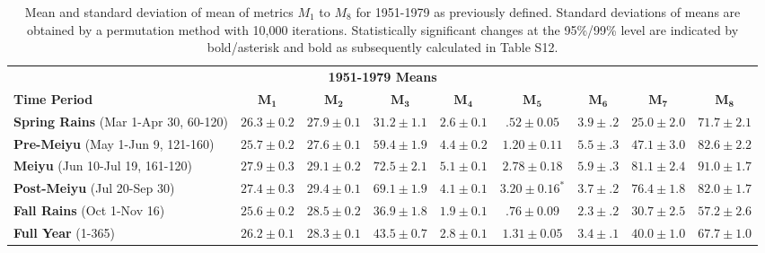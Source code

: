 \begin{table}[p]

\centering

\caption{Mean and standard deviation of mean of metrics $M_1$ to $M_8$ for 1951-1979 as previously defined. Standard deviations of means are obtained by a permutation method with 10,000 iterations. Statistically significant changes at the 95\%/99\% level are indicated by bold/asterisk and bold as subsequently calculated in Table S12.}

\begin{tabular}{ l c c c c c c c c}
	 \multicolumn{9}{c}{\textbf{1951-1979 Means}}  \\
	 \textbf{Time Period} 						& $\boldsymbol{M_1}$ & $\boldsymbol{M_2}$ & $\boldsymbol{M_3}$ & $\boldsymbol{M_4}$ & $\boldsymbol{M_5}$ & $\boldsymbol{M_6}$ & $\boldsymbol{M_7}$ & $\boldsymbol{M_8}$ \\
	 \hline
	\textbf{Spring Rains} (Mar 1-Apr 30, 60-120) 	& $26.3 \pm 0.2$ 	&  $\boldsymbol{27.9 \pm 0.1}$	&  $31.2 \pm 1.1$ 	&$2.6 \pm 0.1$ 	& $.52 \pm 0.05$ 		& $3.9 \pm .2$ & $25.0 \pm 2.0$ & $71.7 \pm 2.1$  \\
	\textbf{Pre-Meiyu} (May 1-Jun 9, 121-160) 		& $25.7 \pm 0.2$ 	&  $27.6 \pm 0.1$				&  $59.4 \pm 1.9$ 	&$4.4 \pm 0.2$	& $1.20 \pm 0.11$ 	& $5.5 \pm .3$ & $47.1 \pm 3.0$ & $82.6 \pm 2.2$ \\
	\textbf{Meiyu} (Jun 10-Jul 19, 161-120) 		& $27.9 \pm 0.3$ 	&  $29.1 \pm 0.2$				&  $72.5 \pm 2.1$ 	&$5.1 \pm 0.1$ 	& $2.78 \pm 0.18$		& $5.9 \pm .3$ & $81.1 \pm 2.4$ & $91.0 \pm 1.7$ \\
	\textbf{Post-Meiyu} (Jul 20-Sep 30) 			& $27.4 \pm 0.3 $	&  $29.4 \pm 0.1$ 				&  $69.1 \pm 1.9$ 	&$4.1 \pm 0.1$ 	& $\boldsymbol{3.20 \pm 0.16^*}$		& $3.7 \pm .2$ & $76.4 \pm 1.8$ & $82.0 \pm 1.7$ \\
	\textbf{Fall Rains} (Oct 1-Nov 16) 				& $25.6 \pm 0.2 $ 	&  $28.5 \pm 0.2$				&  $36.9 \pm 1.8$ 	&$1.9 \pm 0.1$	& $.76 \pm 0.09$ 		& $2.3 \pm .2$ & $30.7 \pm 2.5$ & $57.2 \pm 2.6$ \\
	\textbf{Full Year} (1-365) 					& $26.2 \pm 0.1$ 	&  $28.3 \pm 0.1$ 				&  $43.5 \pm 0.7$ 	&$2.8 \pm 0.1$ 	& $\boldsymbol{1.31 \pm 0.05}$		& $3.4 \pm .1$ & $40.0 \pm 1.0$ & $67.7 \pm 1.0$ \\
\end{tabular}
\label{ts4}
\end{table}


